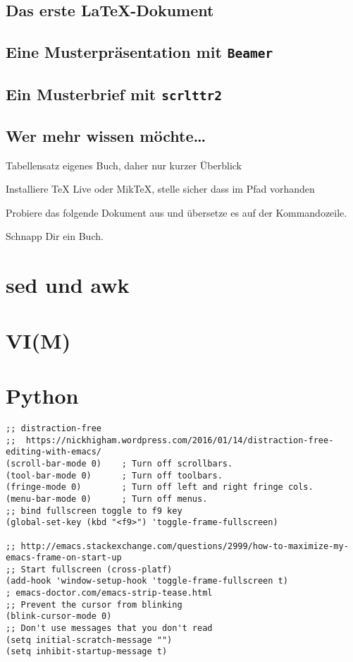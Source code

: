 \documentclass[12pt,ngerman]{scrbook}
\begin{document}
\subsection{Das erste \LaTeX-Dokument}


\subsection{Eine Musterpräsentation mit \texttt{Beamer}}


\subsection{Ein Musterbrief mit \texttt{scrlttr2}}


\subsection{Wer mehr wissen möchte\ldots}


Tabellensatz eigenes Buch, daher nur kurzer Überblick

Installiere TeX Live oder MikTeX, stelle sicher dass im Pfad vorhanden

Probiere das folgende Dokument aus und übersetze es auf der Kommandozeile.

Schnapp Dir ein Buch.

\section{sed und awk}

\section{VI(M)}



\section{Python}

\backmatter

\blindtext

\begin{lstlisting}[basicstyle=\ttfamily] % <--- here
;; distraction-free
;;  https://nickhigham.wordpress.com/2016/01/14/distraction-free-editing-with-emacs/
(scroll-bar-mode 0)    ; Turn off scrollbars.
(tool-bar-mode 0)      ; Turn off toolbars.
(fringe-mode 0)        ; Turn off left and right fringe cols.
(menu-bar-mode 0)      ; Turn off menus.
;; bind fullscreen toggle to f9 key
(global-set-key (kbd "<f9>") 'toggle-frame-fullscreen)

;; http://emacs.stackexchange.com/questions/2999/how-to-maximize-my-emacs-frame-on-start-up
;; Start fullscreen (cross-platf)
(add-hook 'window-setup-hook 'toggle-frame-fullscreen t)
; emacs-doctor.com/emacs-strip-tease.html
;; Prevent the cursor from blinking
(blink-cursor-mode 0)
;; Don't use messages that you don't read
(setq initial-scratch-message "")
(setq inhibit-startup-message t)
\end{lstlisting}

\nocite{*}

\printbibliography 
\end{document}

